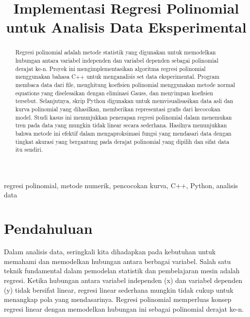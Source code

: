 \documentclass[conference]{IEEEtran}
\begin{document}
\title{Implementasi Regresi Polinomial untuk Analisis Data Eksperimental}

\author{
}

\maketitle

\begin{abstract}
Regresi polinomial adalah metode statistik yang digunakan untuk memodelkan hubungan antara variabel independen dan variabel dependen sebagai polinomial derajat ke-n. Proyek ini mengimplementasikan algoritma regresi polinomial menggunakan bahasa C++ untuk menganalisis set data eksperimental. Program membaca data dari file, menghitung koefisien polinomial menggunakan metode normal equations yang diselesaikan dengan eliminasi Gauss, dan menyimpan koefisien tersebut. Selanjutnya, skrip Python digunakan untuk memvisualisasikan data asli dan kurva polinomial yang dihasilkan, memberikan representasi grafis dari kecocokan model. Studi kasus ini menunjukkan penerapan regresi polinomial dalam menemukan tren pada data yang mungkin tidak linear secara sederhana. Hasilnya menunjukkan bahwa metode ini efektif dalam mengaproksimasi fungsi yang mendasari data dengan tingkat akurasi yang bergantung pada derajat polinomial yang dipilih dan sifat data itu sendiri.
\end{abstract}

\begin{IEEEkeywords}
regresi polinomial, metode numerik, pencocokan kurva, C++, Python, analisis data
\end{IEEEkeywords}

\section{Pendahuluan}
Dalam analisis data, seringkali kita dihadapkan pada kebutuhan untuk memahami dan memodelkan hubungan antara berbagai variabel. Salah satu teknik fundamental dalam pemodelan statistik dan pembelajaran mesin adalah regresi. Ketika hubungan antara variabel independen (x) dan variabel dependen (y) tidak bersifat linear, regresi linear sederhana mungkin tidak cukup untuk menangkap pola yang mendasarinya. Regresi polinomial memperluas konsep regresi linear dengan memodelkan hubungan ini sebagai polinomial derajat ke-n.
\end{document}
